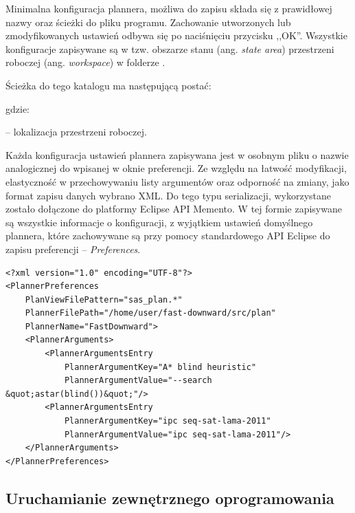 Minimalna konfiguracja plannera, możliwa do zapisu składa się z prawidłowej nazwy oraz ścieżki do pliku programu. Zachowanie utworzonych lub zmodyfikowanych ustawień odbywa się po naciśnięciu przycisku ,,OK''.
Wszystkie konfiguracje zapisywane są w tzw. obszarze stanu (ang. \textit{state area}) przestrzeni roboczej (ang. \textit{workspace}) w folderze . 

Ścieżka do tego katalogu ma następującą postać:

\noindent
\centerline{}

\noindent
gdzie:

\noindent
\textbf{} -- lokalizacja przestrzeni roboczej.

Każda konfiguracja ustawień plannera zapisywana jest w osobnym pliku o nazwie analogicznej do wpisanej w oknie preferencji. Ze względu na łatwość modyfikacji, elastyczność w przechowywaniu listy argumentów oraz odporność na zmiany, jako format zapisu danych wybrano XML. Do tego typu serializacji, wykorzystane zostało dołączone do platformy Eclipse API Memento. W tej formie zapisywane są wszystkie informacje o konfiguracji, z wyjątkiem ustawień domyślnego plannera, które zachowywane są przy pomocy standardowego API Eclipse do zapisu preferencji -- \textit{Preferences}.

\lstset{language=XML}          %
\begin{lstlisting}[frame=single,caption={Przykładowa konfiguracja plannera FastDownward w postaci XML}]  % Start your code-block
<?xml version="1.0" encoding="UTF-8"?>
<PlannerPreferences 
	PlanViewFilePattern="sas_plan.*" 
	PlannerFilePath="/home/user/fast-downward/src/plan" 
	PlannerName="FastDownward">
	<PlannerArguments>
		<PlannerArgumentsEntry 
			PlannerArgumentKey="A* blind heuristic" 
			PlannerArgumentValue="--search &quot;astar(blind())&quot;"/>
		<PlannerArgumentsEntry 
			PlannerArgumentKey="ipc seq-sat-lama-2011" 
			PlannerArgumentValue="ipc seq-sat-lama-2011"/>
	</PlannerArguments>
</PlannerPreferences>
\end{lstlisting}

\subsection{Uruchamianie zewnętrznego oprogramowania}
\label{subsec:uruchamianie}

